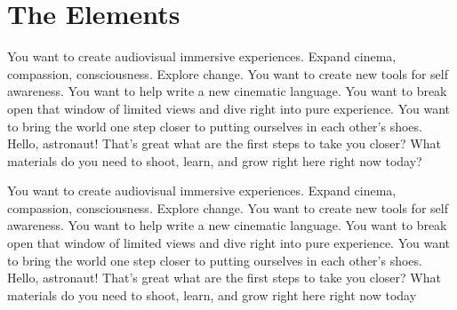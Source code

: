 \chapter{The Elements}
\label{chap:1}
\begin{fullwidth}


\problem


You want to create audiovisual immersive experiences. Expand cinema, compassion, consciousness. Explore change. You want to create new tools for self awareness. You want to help write a new cinematic language. You want to break open that window of limited views and dive right into pure experience. You want to bring the world one step closer to putting ourselves in each other's shoes. Hello, astronaut! That's great what are the first steps to take you closer? What materials do you need to shoot, learn, and grow right here right now today?

\solution


You want to create audiovisual immersive experiences. Expand cinema, compassion, consciousness. Explore change. You want to create new tools for self awareness. You want to help write a new cinematic language. You want to break open that window of limited views and dive right into pure experience. You want to bring the world one step closer to putting ourselves in each other's shoes. Hello, astronaut! That's great what are the first steps to take you closer? What materials do you need to shoot, learn, and grow right here right now today

\clearpage

\end{fullwidth}